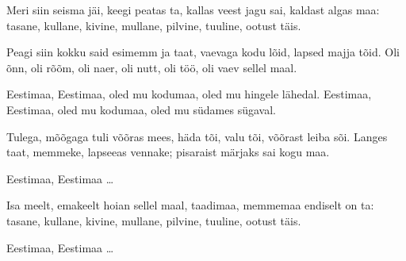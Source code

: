 Meri siin seisma j\"ai, keegi peatas ta,
kallas veest jagu sai, kaldast algas maa:
tasane, kullane, kivine, mullane,
pilvine, tuuline, ootust t\"ais.

Peagi siin kokku said esimemm ja taat,
vaevaga kodu l\~oid, lapsed majja t\~oid.
Oli \~onn, oli r\~o\~om, oli naer, oli nutt,
oli t\"o\"o, oli vaev sellel maal.

Eestimaa, Eestimaa, oled mu kodumaa,
oled mu hingele l\"ahedal.
Eestimaa, Eestimaa, oled mu kodumaa,
oled mu s\"udames s\"ugaval.

Tulega, m\~o\~ogaga tuli v\~o\~oras mees,
h\"ada t\~oi, valu t\~oi, v\~o\~orast leiba s\~oi.
Langes taat, memmeke, lapseeas vennake;
pisaraist m\"arjaks sai kogu maa.

Eestimaa, Eestimaa \ldots

Isa meelt, emakeelt hoian sellel maal,
taadimaa, memmemaa endiselt on ta:
tasane, kullane, kivine, mullane,
pilvine, tuuline, ootust t\"ais.

Eestimaa, Eestimaa \ldots